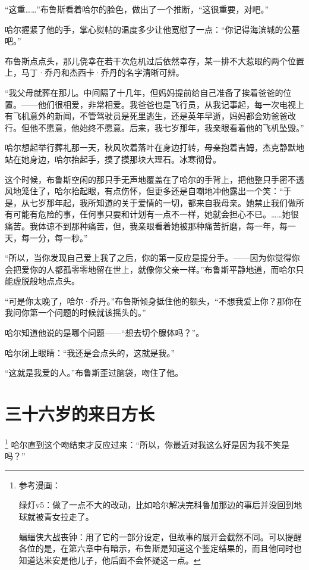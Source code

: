 \documentclass[../main]{subfiles}
\begin{document}
“这重……”布鲁斯看着哈尔的脸色，做出了一个推断，“这很重要，对吧。”

哈尔握紧了他的手，掌心熨帖的温度多少让他宽慰了一点：“你记得海滨城的公墓吧。”

布鲁斯点点头，那儿侥幸在若干次危机过后依然幸存，某一排不大惹眼的两个位置上，马丁·乔丹和杰西卡·乔丹的名字清晰可辨。

“我父母就葬在那儿。中间隔了十几年，但妈妈提前给自己准备了挨着爸爸的位置。——他们很相爱，非常相爱。我爸爸也是飞行员，从我记事起，每一次电视上有飞机意外的新闻，不管驾驶员是死里逃生，还是英年早逝，妈妈都会劝爸爸改行。但他不愿意，他始终不愿意。后来，我七岁那年，我亲眼看着他的飞机坠毁。”

哈尔想起举行葬礼那一天，秋风吹着落叶在身边打转，母亲抱着吉姆，杰克静默地站在她身边，哈尔抬起手，摸了摸那块大理石。冰寒彻骨。

这个时候，布鲁斯空闲的那只手无声地覆盖在了哈尔的手背上，把他整只手密不透风地笼住了，哈尔抬起眼，有点伤怀，但更多还是自嘲地冲他露出一个笑：“于是，从七岁那年起，我所知道的关于爱情的一切，都来自我母亲。她禁止我们做所有可能有危险的事，任何事只要和计划有一点不一样，她就会担心不已。……她很痛苦。我体谅不到那种痛苦，但，我亲眼看着她被那种痛苦折磨，每一年，每一天，每一分，每一秒。”

“所以，当你发现自己爱上我了之后，你的第一反应是提分手。——因为你觉得你会把爱你的人都孤零零地留在世上，就像你父亲一样。”布鲁斯平静地道，而哈尔只能虚脱般地点点头。

“可是你太晚了，哈尔·乔丹。”布鲁斯倾身抵住他的额头，“不想我爱上你？那你在我问你第一个问题的时候就该摇头的。”

哈尔知道他说的是哪个问题——“想去切个腺体吗？”。

哈尔闭上眼睛：“我还是会点头的，这就是我。”

“这就是我爱的人。”布鲁斯歪过脑袋，吻住了他。

\section{三十六岁的来日方长}

\footnote[1]{参考漫画：

    绿灯v5：做了一点不大的改动，比如哈尔解决完科鲁加那边的事后并没回到地球就被青女拉走了。

    蝙蝠侠大战丧钟：用了它的一部分设定，但故事的展开会截然不同。可以提醒各位的是，在第六章中有暗示，布鲁斯是知道这个鉴定结果的，而且他同时也知道达米安是他儿子，他后面不会怀疑这一点。}
哈尔直到这个吻结束才反应过来：“所以，你最近对我这么好是因为我不笑是吗？”
\end{document}
